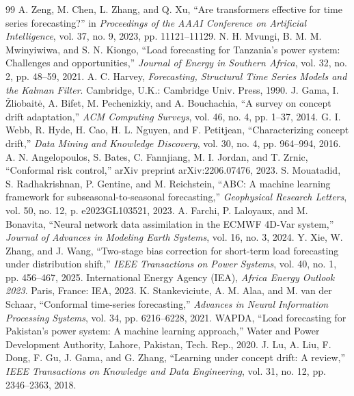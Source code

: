 \documentclass[journal]{IEEEtran}
\begin{document}
\begin{table}[t]
\begin{thebibliography}{99}
 A. Zeng, M. Chen, L. Zhang, and Q. Xu, ``Are transformers effective for time series forecasting?'' in \textit{Proceedings of the AAAI Conference on Artificial Intelligence}, vol. 37, no. 9, 2023, pp. 11121--11129.
 N. H. Mvungi, B. M. M. Mwinyiwiwa, and S. N. Kiongo, ``Load forecasting for Tanzania's power system: Challenges and opportunities,'' \textit{Journal of Energy in Southern Africa}, vol. 32, no. 2, pp. 48--59, 2021.
 A. C. Harvey, \textit{Forecasting, Structural Time Series Models and the Kalman Filter}. Cambridge, U.K.: Cambridge Univ. Press, 1990.
 J. Gama, I. \v{Z}liobait\.{e}, A. Bifet, M. Pechenizkiy, and A. Bouchachia, ``A survey on concept drift adaptation,'' \textit{ACM Computing Surveys}, vol. 46, no. 4, pp. 1--37, 2014.
 G. I. Webb, R. Hyde, H. Cao, H. L. Nguyen, and F. Petitjean, ``Characterizing concept drift,'' \textit{Data Mining and Knowledge Discovery}, vol. 30, no. 4, pp. 964--994, 2016.
 A. N. Angelopoulos, S. Bates, C. Fannjiang, M. I. Jordan, and T. Zrnic, ``Conformal risk control,'' arXiv preprint arXiv:2206.07476, 2023.
 S. Mouatadid, S. Radhakrishnan, P. Gentine, and M. Reichstein, ``ABC: A machine learning framework for subseasonal-to-seasonal forecasting,'' \textit{Geophysical Research Letters}, vol. 50, no. 12, p. e2023GL103521, 2023.
 A. Farchi, P. Laloyaux, and M. Bonavita, ``Neural network data assimilation in the ECMWF 4D-Var system,'' \textit{Journal of Advances in Modeling Earth Systems}, vol. 16, no. 3, 2024.
 Y. Xie, W. Zhang, and J. Wang, ``Two-stage bias correction for short-term load forecasting under distribution shift,'' \textit{IEEE Transactions on Power Systems}, vol. 40, no. 1, pp. 456--467, 2025.
 International Energy Agency (IEA), \textit{Africa Energy Outlook 2023}. Paris, France: IEA, 2023.
 K. Stankeviciute, A. M. Alaa, and M. van der Schaar, ``Conformal time-series forecasting,'' \textit{Advances in Neural Information Processing Systems}, vol. 34, pp. 6216--6228, 2021.
 WAPDA, ``Load forecasting for Pakistan's power system: A machine learning approach,'' Water and Power Development Authority, Lahore, Pakistan, Tech. Rep., 2020.
 J. Lu, A. Liu, F. Dong, F. Gu, J. Gama, and G. Zhang, ``Learning under concept drift: A review,'' \textit{IEEE Transactions on Knowledge and Data Engineering}, vol. 31, no. 12, pp. 2346--2363, 2018.

\end{thebibliography}
\end{table}
\end{document}
